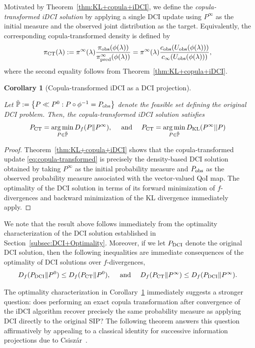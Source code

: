 \documentclass{article}
\newtheorem{corollary}{Corollary}[section]
\newcommand{\p}{\mathbb{P}}
\DeclareMathOperator*{\argmin}{arg\,min}
\begin{document}
Motivated by Theorem~\ref{thm:KL+copula+iDCI}, we define the \emph{copula-transformed iDCI solution} by applying a single DCI update using $P^\infty$ as the initial measure and the observed joint distribution as the target.
Equivalently, the corresponding copula-transformed density is defined by
\begin{equation}
\pi_{\rm CT}(\lambda)
:=
\pi^\infty(\lambda)
\frac{\pi_{\rm obs}(\phi(\lambda))}
     {\pi_{\rm pred}^\infty(\phi(\lambda))}
=
\pi^\infty(\lambda)
\frac{
c_{\rm obs}(U_{\rm obs}(\phi(\lambda)))
}{
c_\infty(U_{\rm obs}(\phi(\lambda)))
},
\label{eq:copula-transformed}
\end{equation}
where the second equality follows from Theorem~\ref{thm:KL+copula+iDCI}.

\begin{corollary}[Copula-transformed iDCI as a DCI projection]\label{thm:cc_iDCI}

Let $
\tilde{\p}
:=
\left\{
P\ll P^0:
P\circ\phi^{-1}
=
P_{\rm obs}
\right\}
$
denote the feasible set defining the original DCI problem.
Then, the copula-transformed iDCI solution satisfies
\[
P_{\rm CT}
=
\operatorname*{arg\,min}_{P\in \tilde{\p}}
D_f(P\|P^\infty), \quad \text{ and } \quad
P_{\rm CT} = \argmin_{P\in \tilde{\p}} D_{\rm KL}(P^\infty || P)
\]
\end{corollary}

\begin{proof}
Theorem~\ref{thm:KL+copula+iDCI} shows that the copula-transformed update
\eqref{eq:copula-transformed}
is precisely the density-based DCI solution obtained by taking
$P^\infty$
as the initial probability measure and
$P_{\rm obs}$
as the observed probability measure associated with the vector-valued QoI map.
The optimality of the DCI solution in terms of its forward minimization of $f$-divergences and backward minimization of the KL divergence immediately apply. \end{proof}

We note that the result above follows immediately from the optimality characterization of the DCI solution established in Section~\ref{subsec:DCI+Optimality}.
Moreover, if we let $P_{\rm DCI}$ denote the original DCI solution, then the following inequalities are immediate consequences of the optimality of DCI solutions over $f$-divergences,
\[
D_f(P_{\rm DCI}\|P^0)
\le
D_f(P_{\rm CT}\|P^0),
\quad \text{ and } \quad
D_f(P_{\rm CT}\|P^\infty)
\le
D_f(P_{\rm DCI}\|P^\infty).
\]

The optimality characterization in Corollary~\ref{thm:cc_iDCI} immediately suggests a stronger question: does performing an exact copula transformation after convergence of the iDCI algorithm recover precisely the same probability measure as applying DCI directly to the original SIP? The following theorem answers this question affirmatively by appealing to a classical identity for successive information projections due to Csiszár~\cite{Csiszar1975}.
\end{document}
